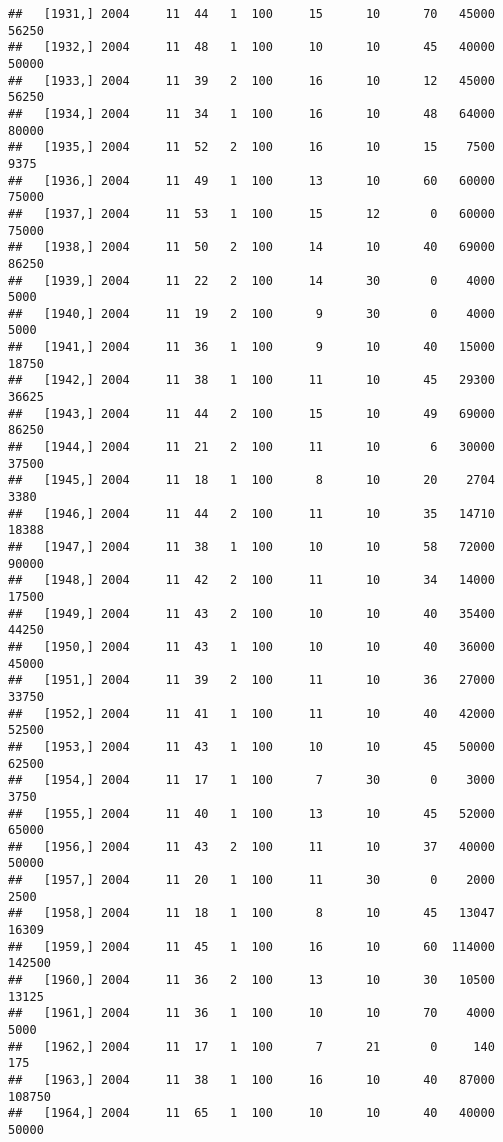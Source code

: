 \documentclass{article}\usepackage[]{graphicx}\usepackage[]{color}
\makeatletter
\newenvironment{kframe}{%
 \def\at@end@of@kframe{}%
 \ifinner\ifhmode%
  \def\at@end@of@kframe{\end{minipage}}%
  \begin{minipage}{\columnwidth}%
 \fi\fi%
 \def\FrameCommand##1{\hskip\@totalleftmargin \hskip-\fboxsep
 \colorbox{shadecolor}{##1}\hskip-\fboxsep
     \hskip-\linewidth \hskip-\@totalleftmargin \hskip\columnwidth}%
 \MakeFramed {\advance\hsize-\width
   \@totalleftmargin\z@ \linewidth\hsize
   \@setminipage}}%
 {\par\unskip\endMakeFramed%
 \at@end@of@kframe}
\newenvironment{knitrout}{}{} %
\makeatother
\begin{document}
\begin{knitrout}
\begin{kframe}
\begin{verbatim}
##   [1931,] 2004     11  44   1  100     15      10      70   45000   56250
##   [1932,] 2004     11  48   1  100     10      10      45   40000   50000
##   [1933,] 2004     11  39   2  100     16      10      12   45000   56250
##   [1934,] 2004     11  34   1  100     16      10      48   64000   80000
##   [1935,] 2004     11  52   2  100     16      10      15    7500    9375
##   [1936,] 2004     11  49   1  100     13      10      60   60000   75000
##   [1937,] 2004     11  53   1  100     15      12       0   60000   75000
##   [1938,] 2004     11  50   2  100     14      10      40   69000   86250
##   [1939,] 2004     11  22   2  100     14      30       0    4000    5000
##   [1940,] 2004     11  19   2  100      9      30       0    4000    5000
##   [1941,] 2004     11  36   1  100      9      10      40   15000   18750
##   [1942,] 2004     11  38   1  100     11      10      45   29300   36625
##   [1943,] 2004     11  44   2  100     15      10      49   69000   86250
##   [1944,] 2004     11  21   2  100     11      10       6   30000   37500
##   [1945,] 2004     11  18   1  100      8      10      20    2704    3380
##   [1946,] 2004     11  44   2  100     11      10      35   14710   18388
##   [1947,] 2004     11  38   1  100     10      10      58   72000   90000
##   [1948,] 2004     11  42   2  100     11      10      34   14000   17500
##   [1949,] 2004     11  43   2  100     10      10      40   35400   44250
##   [1950,] 2004     11  43   1  100     10      10      40   36000   45000
##   [1951,] 2004     11  39   2  100     11      10      36   27000   33750
##   [1952,] 2004     11  41   1  100     11      10      40   42000   52500
##   [1953,] 2004     11  43   1  100     10      10      45   50000   62500
##   [1954,] 2004     11  17   1  100      7      30       0    3000    3750
##   [1955,] 2004     11  40   1  100     13      10      45   52000   65000
##   [1956,] 2004     11  43   2  100     11      10      37   40000   50000
##   [1957,] 2004     11  20   1  100     11      30       0    2000    2500
##   [1958,] 2004     11  18   1  100      8      10      45   13047   16309
##   [1959,] 2004     11  45   1  100     16      10      60  114000  142500
##   [1960,] 2004     11  36   2  100     13      10      30   10500   13125
##   [1961,] 2004     11  36   1  100     10      10      70    4000    5000
##   [1962,] 2004     11  17   1  100      7      21       0     140     175
##   [1963,] 2004     11  38   1  100     16      10      40   87000  108750
##   [1964,] 2004     11  65   1  100     10      10      40   40000   50000

\end{verbatim}
\end{kframe}
\end{knitrout}
\end{document}

